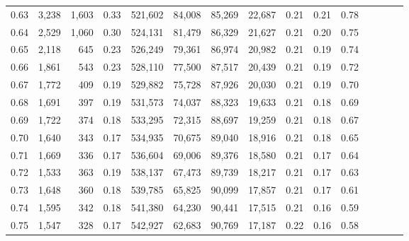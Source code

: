 \begin{tabular}{rrrcrrrrrrrrrrr}
0.63 &   3,238 &   1,603 &                                       0.33 &  521,602 &   84,008 &   85,269 &  22,687 &  0.21 &  0.21 &                         0.78 \\
0.64 &   2,529 &   1,060 &                                       0.30 &  524,131 &   81,479 &   86,329 &  21,627 &  0.21 &  0.20 &                         0.75 \\
0.65 &   2,118 &     645 &                                       0.23 &  526,249 &   79,361 &   86,974 &  20,982 &  0.21 &  0.19 &                         0.74 \\
0.66 &   1,861 &     543 &                                       0.23 &  528,110 &   77,500 &   87,517 &  20,439 &  0.21 &  0.19 &                         0.72 \\
0.67 &   1,772 &     409 &                                       0.19 &  529,882 &   75,728 &   87,926 &  20,030 &  0.21 &  0.19 &                         0.70 \\
0.68 &   1,691 &     397 &                                       0.19 &  531,573 &   74,037 &   88,323 &  19,633 &  0.21 &  0.18 &                         0.69 \\
0.69 &   1,722 &     374 &                                       0.18 &  533,295 &   72,315 &   88,697 &  19,259 &  0.21 &  0.18 &                         0.67 \\
0.70 &   1,640 &     343 &                                       0.17 &  534,935 &   70,675 &   89,040 &  18,916 &  0.21 &  0.18 &                         0.65 \\
0.71 &   1,669 &     336 &                                       0.17 &  536,604 &   69,006 &   89,376 &  18,580 &  0.21 &  0.17 &                         0.64 \\
0.72 &   1,533 &     363 &                                       0.19 &  538,137 &   67,473 &   89,739 &  18,217 &  0.21 &  0.17 &                         0.63 \\
0.73 &   1,648 &     360 &                                       0.18 &  539,785 &   65,825 &   90,099 &  17,857 &  0.21 &  0.17 &                         0.61 \\
0.74 &   1,595 &     342 &                                       0.18 &  541,380 &   64,230 &   90,441 &  17,515 &  0.21 &  0.16 &                         0.59 \\
0.75 &   1,547 &     328 &                                       0.17 &  542,927 &   62,683 &   90,769 &  17,187 &  0.22 &  0.16 &                         0.58 \\

\end{tabular}
